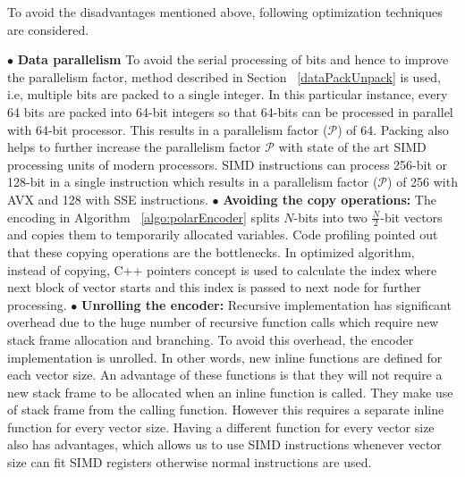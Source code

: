 To avoid the disadvantages mentioned above, following optimization techniques are considered.

$\bullet$ \textbf{Data parallelism} To avoid the serial processing of bits and hence to improve the parallelism factor, method described in Section ~\ref{dataPackUnpack} is used, i.e, multiple bits are packed to a single integer. In this particular instance, every 64 bits are packed into 64-bit integers so that 64-bits can be processed in parallel with 64-bit processor. This results in a parallelism factor ($\mathcal{P}$) of 64. Packing also helps to further increase the parallelism factor $\mathcal{P}$ with state of the art SIMD processing units of modern processors. SIMD instructions can process 256-bit or 128-bit in a single instruction which results in a parallelism factor ($\mathcal{P}$) of 256 with AVX and 128 with SSE instructions. \newline
\newline
$\bullet$ \textbf{Avoiding the copy operations:} The encoding in Algorithm ~\ref{algo:polarEncoder} splits $N$-bits into two $\frac{N}{2}$-bit vectors and copies them to temporarily allocated variables. Code profiling pointed out that these copying operations are the bottlenecks. In optimized algorithm, instead of copying, C++ pointers concept is used to calculate the index where next block of vector starts and this index is passed to next node for further processing. \newline
\newline
$\bullet$ \textbf{Unrolling the encoder:} Recursive implementation has significant overhead due to the huge number of recursive function calls which require new stack frame allocation and branching. To avoid this overhead, the encoder implementation is unrolled. In other words, new inline functions are defined for each vector size. An advantage of these functions is that they will not require a new stack frame to be allocated when an inline function is called. They make use of stack frame from the calling function. However this requires a separate inline function for every vector size. Having a different function for every vector size also has advantages, which allows us to use SIMD instructions whenever vector size can fit SIMD registers otherwise normal instructions are used. \newline
\newline
